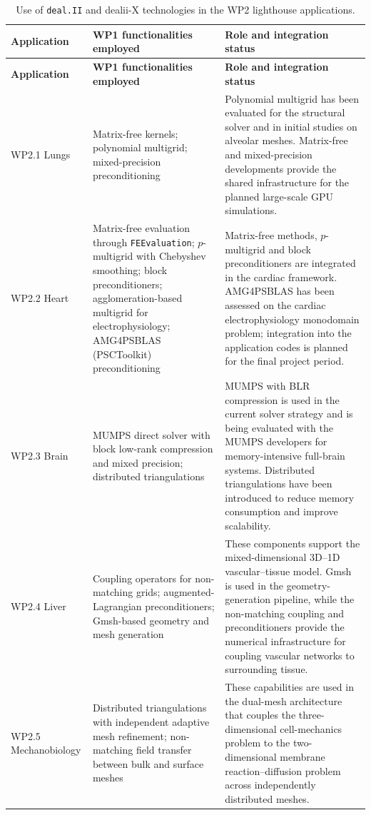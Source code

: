 \documentclass[a4paper,12pt]{article}
\begin{document}
\begingroup
\small
\renewcommand{\arraystretch}{1.2}
\begin{longtable}{p{2.2cm}p{6.5cm}p{4.4cm}}
\caption{Use of \texttt{deal.II} and dealii-X technologies in the WP2
lighthouse applications.}
\label{tab:wp1_wp2_mapping}\\
\toprule
\textbf{Application} & \textbf{WP1 functionalities employed} &
\textbf{Role and integration status} \\
\midrule
\endfirsthead
\toprule
\textbf{Application} & \textbf{WP1 functionalities employed} &
\textbf{Role and integration status} \\
\midrule
\endhead
WP2.1 Lungs &
Matrix-free kernels; polynomial multigrid; mixed-precision preconditioning &
Polynomial multigrid has been evaluated for the structural solver and in
initial studies on alveolar meshes. Matrix-free and mixed-precision
developments provide the shared infrastructure for the planned large-scale
GPU simulations. \\
\midrule
WP2.2 Heart &
Matrix-free evaluation through \texttt{FEEvaluation}; $p$-multigrid with
Chebyshev smoothing; block preconditioners; agglomeration-based multigrid for
electrophysiology; AMG4PSBLAS (PSCToolkit) preconditioning &
Matrix-free methods, $p$-multigrid and block preconditioners are integrated
in the cardiac framework. AMG4PSBLAS has been assessed on the cardiac
electrophysiology monodomain problem; integration into the application codes
is planned for the final project period. \\
\midrule
WP2.3 Brain &
MUMPS direct solver with block low-rank compression and mixed precision;
distributed triangulations &
MUMPS with BLR compression is used in the current solver strategy and is
being evaluated with the MUMPS developers for memory-intensive full-brain
systems. Distributed triangulations have been introduced to reduce memory
consumption and improve scalability. \\
\midrule
WP2.4 Liver &
Coupling operators for non-matching grids; augmented-Lagrangian
preconditioners; Gmsh-based geometry and mesh generation &
These components support the mixed-dimensional 3D--1D vascular--tissue
model. Gmsh is used in the geometry-generation pipeline, while the
non-matching coupling and preconditioners provide the numerical
infrastructure for coupling vascular networks to surrounding tissue. \\
\midrule
WP2.5 Mechanobiology &
Distributed triangulations with independent adaptive mesh refinement;
non-matching field transfer between bulk and surface meshes &
These capabilities are used in the dual-mesh architecture that couples the
three-dimensional cell-mechanics problem to the two-dimensional membrane
reaction--diffusion problem across independently distributed meshes. \\
\bottomrule
\end{longtable}
\endgroup
\end{document}
